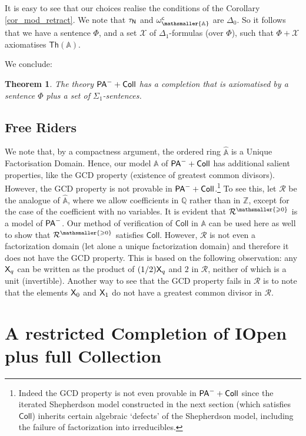 \documentclass{amsart}
\renewcommand{\geq}{\geqslant}
\renewcommand{\Phi}{\varPhi}
\newtheorem{theorem}{Theorem}[section]
\newcommand{\mc}[1]{\mathcal #1}
\newcommand{\pam}{\ensuremath{{\sf PA}^{-}}}
\newcommand{\X}{{\sf X}}
\newcommand{\mbbs}[1]{\ensuremath{\mathsmaller{\mathbb{#1}}}}
\begin{document}
It is easy to see that our choices realise the conditions of the Corollary \ref{cor_mod_retract}.
We note that $\tau_{\sf N}$ and $\omega_{\mbbs A}^{\sf c}$ are $\Delta_0$.
So it follows that we have a sentence $\Phi$, and a set $\mc X$
of $\Delta_1$-formulas  (over $\Phi$), such 
that $\Phi + \mc X$ axiomatises  $\mathsf{Th}(\mathbb{A})$. 

We conclude:

\begin{theorem}\label{uitslagcollsmurf}
    The theory $\pam+{\sf Coll}$ has a completion that is axiomatised by a sentence $\Phi$ plus a set of $\Sigma_1$-sentences. 
\end{theorem}

\subsection{Free Riders}
We note that, by a compactness argument, the ordered ring $\hat{\mathbb A}$ is a Unique Factorisation Domain. Hence, our model $\mathbb A$ of $\pam+{\sf Coll}$ has additional salient properties, like the GCD property (existence of greatest common divisors). However, the GCD property is not provable in $\pam+{\sf Coll}$.\footnote{Indeed the GCD property is not even provable in $\pam+{\sf Coll}$ since the iterated Shepherdson model constructed in the next section (which satisfies $\mathsf{Coll}$) inherits certain algebraic `defects' of the Shepherdson model, including the failure of factorization into irreducibles.} 
To see this, let $\mathcal{R}$ be the analogue of $\hat{\mathbb A}$, where we allow coefficients in $\mathbb Q$ rather than in $\mathbb{Z}$, except for the case
of the coefficient with no variables. It is evident that $\mathcal{R}^{\mathsmaller{\geq 0}}$ is a model of $\pam$. Our method of verification of $\mathsf{Coll}$ in $\mathbb{A}$ can be used here as well to show that $\mathcal{R}^{\mathsmaller{\geq 0}}$ satisfies $\mathsf{Coll}$. However, $\mathcal{R}$ is not even a factorization domain (let alone a unique factorization domain) and therefore it does not have the GCD property. This is based on the following observation: any $\X_q$ can be written as the product of $(1/2)\X_q$ and $2$ in $\mathcal{R}$, neither of which is a unit (invertible). Another way to see that the GCD property fails in $\mathcal{R}$ is to note that the elements $\X_0$ and $\X_1$ do not have a greatest common divisor in $\mathcal{R}$.

\section{A restricted Completion of {\sf IOpen} plus full Collection}\label{iterated_shepherdson}
\end{document}
